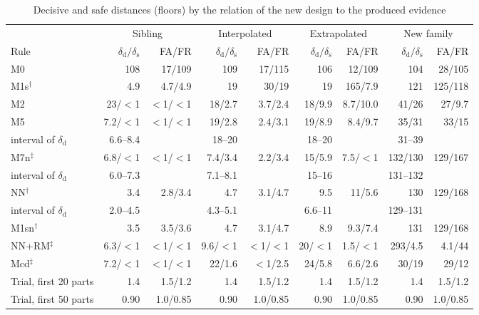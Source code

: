 \documentclass[pdflatex,sn-basic,lineno]{sn-jnl}
\newcommand{\tabsize}{\fontsize{8}{9.5}\selectfont}
\begin{document}
\begin{table}[t]
\tabsize
\setlength{\tabcolsep}{3.4pt}
\caption{Decisive and safe distances (floors) by the relation of the new design to the produced evidence}\label{tab:distances}
\begin{tabular}{@{}lrrrrrrrr@{}}
\toprule
 & \multicolumn{2}{c}{Sibling} & \multicolumn{2}{c}{Interpolated} & \multicolumn{2}{c}{Extrapolated} & \multicolumn{2}{c}{New family} \\
\cmidrule(lr){2-3}\cmidrule(lr){4-5}\cmidrule(lr){6-7}\cmidrule(lr){8-9}
Rule & $\delta_\mathrm{d}/\delta_\mathrm{s}$ & FA/FR & $\delta_\mathrm{d}/\delta_\mathrm{s}$ & FA/FR & $\delta_\mathrm{d}/\delta_\mathrm{s}$ & FA/FR & $\delta_\mathrm{d}/\delta_\mathrm{s}$ & FA/FR \\
\midrule
M0 & 108 & 17/109 & 109 & 17/115 & 106 & 12/109 & 104 & 28/105 \\
M1s$^\dagger$ & 4.9 & 4.7/4.9 & 19 & 30/19 & 19 & 165/7.9 & 121 & 125/118 \\
M2 & 23/$<$1 & $<$1/$<$1 & 18/2.7 & 3.7/2.4 & 18/9.9 & 8.7/10.0 & 41/26 & 27/9.7 \\
M5 & 7.2/$<$1 & $<$1/$<$1 & 19/2.8 & 2.4/3.1 & 19/8.9 & 8.4/9.7 & 35/31 & 33/15 \\
\quad interval of $\delta_\mathrm{d}$ & 6.6--8.4 &  & 18--20 &  & 18--20 &  & 31--39 & \\
M7n$^\ddagger$ & 6.8/$<$1 & $<$1/$<$1 & 7.4/3.4 & 2.2/3.4 & 15/5.9 & 7.5/$<$1 & 132/130 & 129/167 \\
\quad interval of $\delta_\mathrm{d}$ & 6.0--7.3 &  & 7.1--8.1 &  & 15--16 &  & 131--132 & \\
NN$^\dagger$ & 3.4 & 2.8/3.4 & 4.7 & 3.1/4.7 & 9.5 & 11/5.6 & 130 & 129/168 \\
\quad interval of $\delta_\mathrm{d}$ & 2.0--4.5 &  & 4.3--5.1 &  & 6.6--11 &  & 129--131 & \\
M1sn$^\dagger$ & 3.5 & 3.5/3.6 & 4.7 & 3.1/4.7 & 8.9 & 9.3/7.4 & 131 & 129/168 \\
NN+RM$^\ddagger$ & 6.3/$<$1 & $<$1/$<$1 & 9.6/$<$1 & $<$1/$<$1 & 20/$<$1 & 1.5/$<$1 & 293/4.5 & 4.1/44 \\
Mcd$^\ddagger$ & 7.2/$<$1 & $<$1/$<$1 & 22/1.6 & $<$1/2.5 & 24/5.8 & 6.6/2.6 & 30/19 & 29/12 \\
\midrule Trial, first 20 parts & 1.4 & 1.5/1.2 & 1.4 & 1.5/1.2 & 1.4 & 1.5/1.2 & 1.4 & 1.5/1.2 \\
Trial, first 50 parts & 0.90 & 1.0/0.85 & 0.90 & 1.0/0.85 & 0.90 & 1.0/0.85 & 0.90 & 1.0/0.85 \\

\end{tabular}
\end{table}
\end{document}
